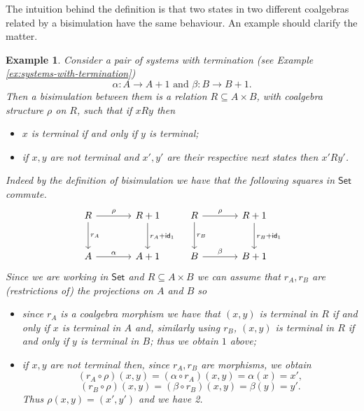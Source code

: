 \documentclass[letterpaper, 11pt, oneside]{memoir}
\theoremstyle{myteo}
\newtheorem{example}[theorem]{Example}
\numberwithin{equation}{section}
\newcommand{\id}{\textsf{id}}
\newcommand{\Set}{\textsf{Set}}
\begin{document}
The intuition behind the definition is that two states in two different coalgebras related by a bisimulation have the same behaviour.
An example should clarify the matter.
\begin{example}
  Consider a pair of systems with termination (see Example \ref{ex:systems-with-termination})
  \begin{equation*}
    \alpha: A \to A + 1 \text{ and } \beta: B \to B + 1.
  \end{equation*}
  Then a bisimulation between them is a relation \(R \subseteq A \times B\), with coalgebra structure \(\rho\) on \(R\), such that if \(x R y\) then
  \begin{itemize}
  \item[1.] \(x\) is terminal if and only if \(y\) is terminal;
  \item[2.] if \(x, y\) are not terminal and \(x', y'\) are their respective next states then \(x' R y'\).
  \end{itemize}
  Indeed by the definition of bisimulation we have that the following squares in \(\Set\) commute.
  \begin{equation}
    \label{dia:fooooo}
    \begin{tikzcd}[sep = large]
      R \ar[r, "\rho"] \ar[d, "r_A"] & R + 1 \ar[d, "r_A + \id_1"] \\
      A \ar[r, "\alpha"] & A + 1
    \end{tikzcd}\quad
    \begin{tikzcd}[sep = large]
      R \ar[r, "\rho"] \ar[d, "r_B"] & R + 1 \ar[d, "r_B + \id_1"] \\
      B \ar[r, "\beta"] & B + 1
    \end{tikzcd}
  \end{equation}
  Since we are working in \(\Set\) and \(R \subseteq A \times B\) we can assume that \(r_A, r_B\) are (restrictions of) the projections  on \(A\) and \(B\) so
  \begin{itemize}
  \item[a.] since \(r_A\) is a coalgebra morphism we have that \((x, y)\) is terminal in \(R\) if and only if \(x\) is terminal in \(A\) and, similarly using \(r_B\), \((x, y)\) is terminal in \(R\) if and only if \(y\) is terminal in \(B\); thus we obtain \(1\) above;
  \item[b.] if \(x, y\) are not terminal then, since \(r_A, r_B\) are morphisms, we obtain
    \begin{equation*}
      (r_A \circ \rho)(x, y) = (\alpha \circ r_A)(x, y) = \alpha(x) = x',
    \end{equation*}
    \begin{equation*}
      (r_B \circ \rho)(x, y) = (\beta \circ r_B)(x, y) = \beta(y) = y'.
    \end{equation*}
    Thus \(\rho(x, y) = (x', y')\) and we have 2.
  \end{itemize}


\end{example}
\end{document}
